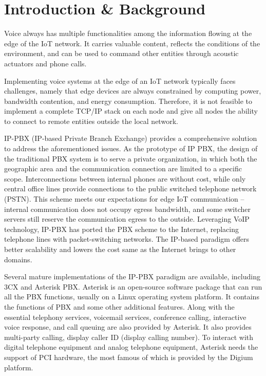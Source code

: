 \section{Introduction \& Background}	
\label{sec:introduction-background}
Voice always has multiple functionalities among the information flowing at the edge of the IoT network. It carries valuable content, reflects the conditions of the environment, and can be used to command other entities through acoustic actuators and phone calls.

Implementing voice systems at the edge of an IoT network typically faces challenges, namely that edge devices are always constrained by computing power, bandwidth contention, and energy consumption. Therefore, it is not feasible to implement a complete TCP/IP stack on each node and give all nodes the ability to connect to remote entities outside the local network.

IP-PBX (IP-based Private Branch Exchange) provides a comprehensive solution to address the aforementioned issues. As the prototype of IP PBX, the design of the traditional PBX system is to serve a private organization, in which both the geographic area and the communication connection are limited to a specific scope. Interconnections between internal phones are without cost, while only central office lines provide connections to the public switched telephone network (PSTN). This scheme meets our expectations for edge IoT communication -- internal communication does not occupy egress bandwidth, and some switcher servers still reserve the communication egress to the outside. Leveraging VoIP technology, IP-PBX has ported the PBX scheme to the Internet, replacing telephone lines with packet-switching networks. The IP-based paradigm offers better scalability and lowers the cost same as the Internet brings to other domains. 

Several mature implementations of the IP-PBX paradigm are available, including 3CX and Asterisk PBX. Asterisk is an open-source software package that can run all the PBX functions, usually on a Linux operating system platform. It contains the functions of PBX and some other additional features. Along with the essential telephony services, voicemail services, conference calling, interactive voice response, and call queuing are also provided by Asterisk. It also provides multi-party calling, display caller ID (display calling number). To interact with digital telephone equipment and analog telephone equipment, Asterisk needs the support of PCI hardware, the most famous of which is provided by the Digium platform. 

